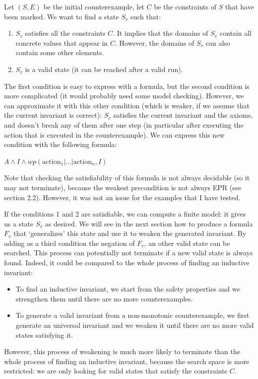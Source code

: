 \documentclass[11pt,a4paper,oldfontcommands,openany]{memoir}
\begin{document}
    Let \((S,E)\) be the initial counterexample, let \(C\) be the constraints of \(S\) that have been marked.
    We want to find a state \(S_v\) such that:
    \begin{enumerate}
        \item \(S_v\) satisfies all the constraints \(C\). It implies that the domains of \(S_v\) contain all concrete values that appear in \(C\).
        However, the domains of \(S_v\) can also contain some other elements.
        \item \(S_v\) is a valid state (it can be reached after a valid run).
    \end{enumerate}

    The first condition is easy to express with a formula, but the second condition is more complicated (it would probably need some model checking).
    However, we can approximate it with this other condition (which is weaker, if we assume that the current invariant is correct):
    \(S_v\) satisfies the current invariant and the axioms, and doesn't break any of them after one step (in particular after executing the action that is executed in the counterexample).
    We can express this new condition with the following formula:

    \(A \land I \land wp(\text{action}_1|\ldots|\text{action}_n,I)\)

    Note that checking the satisfiability of this formula is not always decidable (so it may not terminate), because the weakest precondition is not always EPR (see section 2.2).
    However, it was not an issue for the examples that I have tested.

    If the conditions 1 and 2 are satisfiable, we can compute a finite model: it gives us a state \(S_v\) as desired.
    We will see in the next section how to produce a formula \(F_v\) that `generalizes' this state and use it to weaken the generated invariant.
    By adding as a third condition the negation of \(F_v\), an other valid state can be searched.
    This process can potentially not terminate if a new valid state is always found. Indeed, it could be compared to the whole process of finding an inductive invariant:
    \begin{itemize}
        \item To find an inductive invariant, we start from the safety properties and we strengthen them until there are no more counterexamples.
        \item To generate a valid invariant from a non-monotonic counterexample, we first generate an universal invariant and we weaken it until there are no more valid states satisfying it.
    \end{itemize}
    However, this process of weakening is much more likely to terminate than the whole process of finding an inductive invariant, because the search space is more restricted:
    we are only looking for valid states that satisfy the constraints \(C\).
\end{document}
